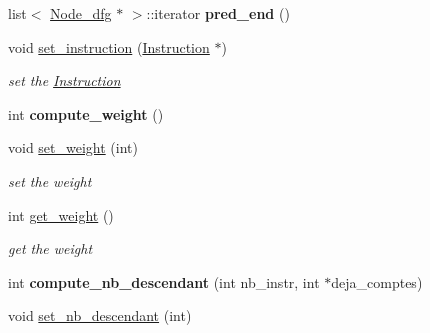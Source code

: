\begin{DoxyCompactItemize}
\item 
\hypertarget{class_node__dfg_a86fc141e0697ae944900625212579957}{list$<$ \hyperlink{class_node__dfg}{Node\-\_\-dfg} $\ast$ $>$\-::iterator {\bfseries pred\-\_\-end} ()}\label{class_node__dfg_a86fc141e0697ae944900625212579957}

\item 
\hypertarget{class_node__dfg_a83747917d9c87b11633779731bcda162}{void \hyperlink{class_node__dfg_a83747917d9c87b11633779731bcda162}{set\-\_\-instruction} (\hyperlink{class_instruction}{Instruction} $\ast$)}\label{class_node__dfg_a83747917d9c87b11633779731bcda162}

\begin{DoxyCompactList}\small\item\em set the \hyperlink{class_instruction}{Instruction} \end{DoxyCompactList}\item 
\hypertarget{class_node__dfg_a395b778a0b23ae2bcfd6081d84661239}{int {\bfseries compute\-\_\-weight} ()}\label{class_node__dfg_a395b778a0b23ae2bcfd6081d84661239}

\item 
\hypertarget{class_node__dfg_af23f48b1521a90178cc5c9a59da3ab3c}{void \hyperlink{class_node__dfg_af23f48b1521a90178cc5c9a59da3ab3c}{set\-\_\-weight} (int)}\label{class_node__dfg_af23f48b1521a90178cc5c9a59da3ab3c}

\begin{DoxyCompactList}\small\item\em set the weight \end{DoxyCompactList}\item 
\hypertarget{class_node__dfg_a561e80f51cb9a71b22f22e8d2e6685de}{int \hyperlink{class_node__dfg_a561e80f51cb9a71b22f22e8d2e6685de}{get\-\_\-weight} ()}\label{class_node__dfg_a561e80f51cb9a71b22f22e8d2e6685de}

\begin{DoxyCompactList}\small\item\em get the weight \end{DoxyCompactList}\item 
\hypertarget{class_node__dfg_a613aa3ee9ce2eb99df07258cbdd5293f}{int {\bfseries compute\-\_\-nb\-\_\-descendant} (int nb\-\_\-instr, int $\ast$deja\-\_\-comptes)}\label{class_node__dfg_a613aa3ee9ce2eb99df07258cbdd5293f}

\item 
\hypertarget{class_node__dfg_a9aa775f727e6c542cd714894219046f3}{void \hyperlink{class_node__dfg_a9aa775f727e6c542cd714894219046f3}{set\-\_\-nb\-\_\-descendant} (int)}\label{class_node__dfg_a9aa775f727e6c542cd714894219046f3}


\end{DoxyCompactItemize}
